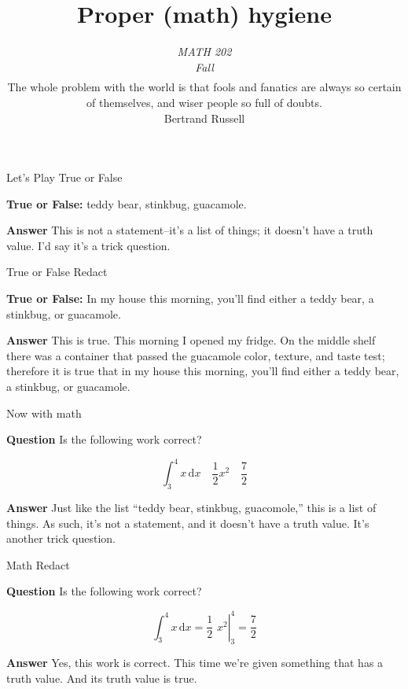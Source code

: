 \documentclass[fleqn]{beamer}
\subtitle{\emph{MATH 202} \\ \emph{Fall \the\year}  \\ $\phantom{xxx}$ \\ The whole problem with the world is that fools and fanatics are always so certain of themselves, and wiser people so full of doubts. \\ \vspace{0.25in} Bertrand Russell}
\title{\textbf{Proper (math) hygiene}}
\date{}
\theoremstyle{definition}
\begin{document}
\frame{\titlepage}

\begin{frame}{Let's Play True or False}

    \textbf{True or False:} teddy bear, stinkbug, guacamole.

    \vspace{0.5in}
    \textbf{Answer} This is not a statement--it's a list of things; it doesn't 
    have a truth value. I'd say it's a trick question.

\vfill 
\end{frame}

\begin{frame}{True or False Redact}

  \textbf{True or False:} In my house this morning, you'll 
  find either a teddy bear, a stinkbug, or guacamole.

  \vspace{0.5in}
  \textbf{Answer} This is true. This morning I opened my fridge. On the
  middle shelf there was a container that passed the guacamole color,
  texture, and taste test; therefore it is true that in my house this morning, you'll 
  find either a teddy bear, a stinkbug, or guacamole.

\vfill 
\end{frame}

\begin{frame}{Now with math}

  \textbf{Question} Is the following work correct?

  \begin{equation*}
    \int_3^4 x \, \mathrm{d}x \quad 
     \frac{1}{2} x^{2} \quad \frac{7}{2}
  \end{equation*}

  \vspace{0.5in}
  \textbf{Answer} Just like the list ``teddy bear, stinkbug, 
  guacomole,''
  this is a list of things. As such, it's not 
  a statement, and it doesn't have a truth value. It's another trick 
  question.
  \vfill 
\end{frame}

\begin{frame}{Math Redact}

  \textbf{Question} Is the following work correct?

  \begin{equation*}
    \int_3^4 x \, \mathrm{d}x =
     \left. \frac{1}{2} \,\, x^{2} \right |_{3}^4 = \frac{7}{2}
  \end{equation*}

  \vspace{0.5in}
  \textbf{Answer} Yes, this work is correct. This time we're 
  given something that has a truth value. And its truth value is
  true.

  \vfill
\end{frame}
\end{document}

